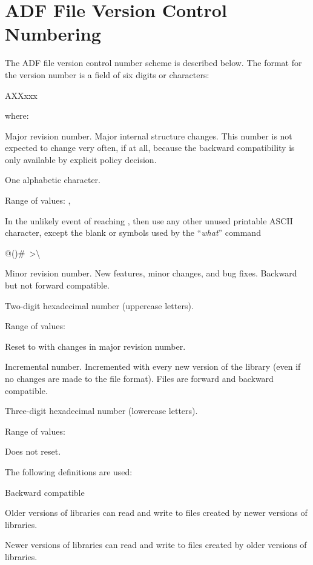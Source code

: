 \section{ADF File Version Control Numbering}
\label{s:versions}
\thispagestyle{plain}

The ADF file version control number scheme is described below.
The format for the version number is a field of six digits or characters:
\begin{indlefttt}
AXXxxx
\end{indlefttt}
where:

\begin{Ventryi}{}
\item [\fort{A}]
      Major revision number.
      Major internal structure changes.
      This number is not expected to change very often, if at all,
      because the backward compatibility is only available by explicit
      policy decision.

      One alphabetic character.

      Range of values: , 

      In the unlikely event of reaching , then use any other
      unused printable ASCII character, except the blank or symbols
      used by the ``\textit{what}'' command 
\begin{indlefttt}
@()#~>\textbackslash
\end{indlefttt}
\item [\fort{XX}]
      Minor revision number.
      New features, minor changes, and bug fixes.
      Backward but not forward compatible.

      Two-digit hexadecimal number (uppercase letters).

      Range of values: 

      Reset to  with changes in major revision number.
\item [\fort{xxx}]
      Incremental number.
      Incremented with every new version of the library (even if no
      changes are made to the file format).
      Files are forward and backward compatible.

      Three-digit hexadecimal number (lowercase letters).

      Range of values: 

      Does not reset.
\end{Ventryi}

\noindent
The following definitions are used:

\begin{Ventryi}{Backward compatible}
\item [Forward compatible]
      Older versions of libraries can read and write to files created
      by newer versions of libraries.
\item [Backward compatible]
      Newer versions of libraries can read and write to files created
      by older versions of libraries.
\end{Ventryi}

